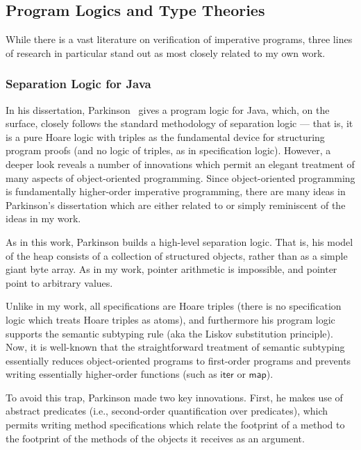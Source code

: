 \subsection{Program Logics and Type Theories}

While there is a vast literature on verification of imperative
programs, three lines of research in particular stand out as most
closely related to my own work.

\subsubsection{Separation Logic for Java}

In his dissertation, Parkinson~\cite{parkinson-thesis} gives a program
logic for Java, which, on the surface, closely follows the standard
methodology of separation logic --- that is, it is a pure Hoare logic
with triples as the fundamental device for structuring program proofs
(and no logic of triples, as in specification logic). However, a
deeper look reveals a number of innovations which permit an elegant
treatment of many aspects of object-oriented programming. Since
object-oriented programming is fundamentally higher-order imperative
programming, there are many ideas in Parkinson's dissertation which
are either related to or simply reminiscent of the ideas in my work.

As in this work, Parkinson builds a high-level separation logic. That
is, his model of the heap consists of a collection of structured
objects, rather than as a simple giant byte array. As in my work,
pointer arithmetic is impossible, and pointer point to arbitrary
values.

Unlike in my work, all specifications are Hoare triples (there is no
specification logic which treats Hoare triples as atoms), and
furthermore his program logic supports the semantic subtyping rule
(aka the Liskov substitution principle). Now, it is well-known that
the straightforward treatment of semantic subtyping essentially
reduces object-oriented programs to first-order programs and prevents
writing essentially higher-order functions (such as $\mathsf{iter}$ or
$\mathsf{map}$). 

To avoid this trap, Parkinson made two key innovations. First, he
makes use of abstract predicates (i.e., second-order quantification
over predicates), which permits writing method specifications which
relate the footprint of a method to the footprint of the methods of
the objects it receives as an argument.

